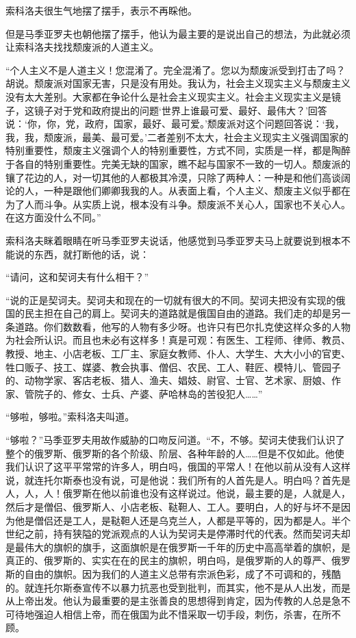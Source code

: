 索科洛夫很生气地摆了摆手，表示不再睬他。

但是马季亚罗夫也朝他摆了摆手，他认为最主要的是说出自己的想法，为此就必须让索科洛夫找找颓废派的人道主义。

“个人主义不是人道主义！您混淆了。完全混淆了。您以为颓废派受到打击了吗？胡说。颓废派对国家无害，只是没有用处。我认为，社会主义现实主义与颓废主义没有太大差别。大家都在争论什么是社会主义现实主义。社会主义现实主义是镜子，这镜子对于党和政府提出的问题‘世界上谁最可爱、最好、最伟大？’回答说：‘你，你，党，政府，国家，最好、最可爱。’颓废派对这个问题回答说：‘我，我，我，颓废派，最美、最可爱。’二者差别不太大，社会主义现实主义强调国家的特别重要性，颓废主义强调个人的特别重要性，方式不同，实质是一样，都是陶醉于各自的特别重要性。完美无缺的国家，瞧不起与国家不一致的一切人。颓废派的镶了花边的人，对一切其他的人都极其冷漠，只除了两种人：一种是和他们高谈阔论的人，一种是跟他们卿卿我我的人。从表面上看，个人主义、颓废主义似乎都在为了人而斗争。从实质上说，根本没有斗争。颓废派不关心人，国家也不关心人。在这方面没什么不同。”

索科洛夫眯着眼睛在听马季亚罗夫说话，他感觉到马季亚罗夫马上就要说到根本不能说的东西，就打断他的话，说：

“请问，这和契诃夫有什么相干？”

“说的正是契诃夫。契诃夫和现在的一切就有很大的不同。契诃夫把没有实现的俄国的民主担在自己的肩上。契诃夫的道路就是俄国自由的道路。我们走的却是另一条道路。你们数数看，他写的人物有多少呀。也许只有巴尔扎克使这样众多的人物为社会所认识。而且也未必有这样多！真是可观：有医生、工程师、律师、教员、教授、地主、小店老板、工厂主、家庭女教师、仆人、大学生、大大小小的官吏、牲口贩子、技工、媒婆、教会执事、僧侣、农民、工人、鞋匠、模特儿、管园子的、动物学家、客店老板、猎人、渔夫、娼妓、尉官、士官、艺术家、厨娘、作家、管院子的、修女、士兵、产婆、萨哈林岛的苦役犯人……”

“够啦，够啦。”索科洛夫叫道。

“够啦？”马季亚罗夫用故作威胁的口吻反问道。“不，不够。契诃夫使我们认识了整个的俄罗斯、俄罗斯的各个阶级、阶层、各种年龄的人……但是不仅如此。他使我们认识了这平平常常的许多人，明白吗，俄国的平常人！在他以前从没有人这样说，就连托尔斯泰也没有说，可是他说：我们所有的人首先是人。明白吗？首先是人，人，人！俄罗斯在他以前谁也没有这样说过。他说，最主要的是，人就是人，然后才是僧侣、俄罗斯人、小店老板、鞑靼人、工人。要明白，人的好与坏不是因为他是僧侣还是工人，是鞑靼人还是乌克兰人，人都是平等的，因为都是人。半个世纪之前，持有狭隘的党派观点的人认为契诃夫是停滞时代的代表。然而契诃夫却是最伟大的旗帜的旗手，这面旗帜是在俄罗斯一千年的历史中高高举着的旗帜，是真正的、俄罗斯的、实实在在的民主的旗帜，明白吗，是俄罗斯的人的尊严、俄罗斯的自由的旗帜。因为我们的人道主义总带有宗派色彩，成了不可调和的，残酷的。就连托尔斯泰宣传不以暴力抗恶也受到批判，而其实，他不是从人出发，而是从上帝出发。他认为最重要的是主张善良的思想得到肯定，因为传教的人总是急不可待地强迫人相信上帝，而在俄国为此不惜采取一切手段，刺伤，杀害，在所不顾。

